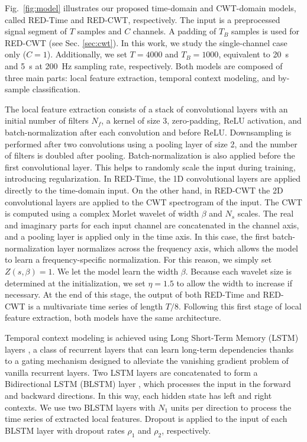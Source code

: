 \documentclass[conference]{IEEEtran}
\begin{document}
Fig.~\ref{fig:model} illustrates our proposed time-domain and CWT-domain models, called RED-Time and RED-CWT, respectively. The input is a preprocessed signal segment of $T$ samples and $C$ channels. A padding of $T_B$ samples is used for RED-CWT (see Sec. \ref{sec:cwt}). In this work, we study the single-channel case only ($C=1$). Additionally, we set $T=4000$ and $T_B=1000$, equivalent to 20~s and 5~s at 200~Hz sampling rate, respectively. Both models are composed of three main parts: local feature extraction, temporal context modeling, and by-sample classification.

The local feature extraction consists of a stack of convolutional layers with an initial number of filters $N_f$, a kernel of size 3, zero-padding, ReLU activation, and batch-normalization \cite{ioffe2015batch} after each convolution and before ReLU. Downsampling is performed after two convolutions using a pooling layer of size 2, and the number of filters is doubled after pooling. Batch-normalization is also applied before the first convolutional layer. This helps to randomly scale the input during training, introducing regularization. In RED-Time, the 1D convolutional layers are applied directly to the time-domain input. On the other hand, in RED-CWT the 2D convolutional layers are applied to the CWT spectrogram of the input. The CWT is computed using a complex Morlet wavelet of width $\beta$ and $N_s$ scales. The real and imaginary parts for each input channel are concatenated in the channel axis, and a pooling layer is applied only in the time axis. In this case, the first batch-normalization layer normalizes across the frequency axis, which allows the model to learn a frequency-specific normalization. For this reason, we simply set $Z(s, \beta)=1$. We let the model learn the width $\beta$. Because each wavelet size is determined at the initialization, we set $\eta=1.5$ to allow the width to increase if necessary. At the end of this stage, the output of both RED-Time and RED-CWT is a multivariate time series of length $T/8$. Following this first stage of local feature extraction, both models have the same architecture.

Temporal context modeling is achieved using Long Short-Term Memory (LSTM) layers \cite{hochreiter1997long}, a class of recurrent layers that can learn long-term dependencies thanks to a gating mechanism designed to alleviate the vanishing gradient problem of vanilla recurrent layers. Two LSTM layers are concatenated to form a Bidirectional LSTM (BLSTM) layer \cite{graves2005framewise}, which processes the input in the forward and backward directions. In this way, each hidden state has left and right contexts. We use two BLSTM layers with $N_1$ units per direction to process the time series of extracted local features. Dropout \cite{srivastava2014dropout} is applied to the input of each BLSTM layer with dropout rates $\rho_1$ and $\rho_2$, respectively. 
\end{document}
